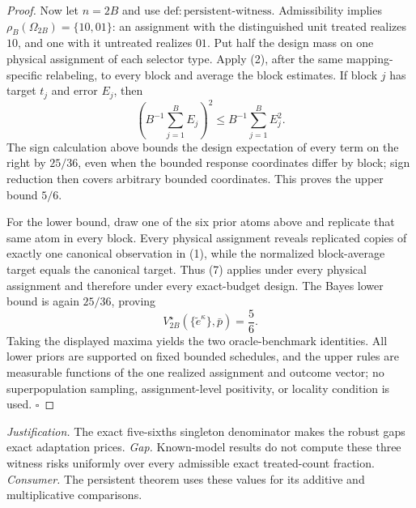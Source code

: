 \documentclass{article}
\begin{document}
\begin{proof}
Now let \(n=2B\) and use \(\mathrm{def{:}persistent\text{-}witness}\). Admissibility implies \(\rho_B(\Omega_{2B})=\{10,01\}\): an assignment with the distinguished unit treated realizes \(10\), and one with it untreated realizes \(01\). Put half the design mass on one physical assignment of each selector type. Apply (2), after the same mapping-specific relabeling, to every block and average the block estimates. If block \(j\) has target \(t_j\) and error \(E_j\), then
\[
 \left(B^{-1}\sum_{j=1}^B E_j\right)^2
 \le B^{-1}\sum_{j=1}^B E_j^2. \tag{9}
\]
The sign calculation above bounds the design expectation of every term on the right by \(25/36\), even when the bounded response coordinates differ by block; sign reduction then covers arbitrary bounded coordinates. This proves the upper bound \(5/6\).

For the lower bound, draw one of the six prior atoms above and replicate that same atom in every block. Every physical assignment reveals replicated copies of exactly one canonical observation in (1), while the normalized block-average target equals the canonical target. Thus (7) applies under every physical assignment and therefore under every exact-budget design. The Bayes lower bound is again \(25/36\), proving
\[
 V_{2B}^\star(\{\widetilde e^\kappa\},\bar p)=\frac56.
\]
Taking the displayed maxima yields the two oracle-benchmark identities. All lower priors are supported on fixed bounded schedules, and the upper rules are measurable functions of the one realized assignment and outcome vector; no superpopulation sampling, assignment-level positivity, or locality condition is used. \(\square\)
\end{proof}
\par\smallskip\noindent \textit{Justification.} The exact five-sixths singleton denominator makes the robust gaps exact adaptation prices. \textit{Gap.} Known-model results do not compute these three witness risks uniformly over every admissible exact treated-count fraction. \textit{Consumer.} The persistent theorem uses these values for its additive and multiplicative comparisons.
\end{document}
